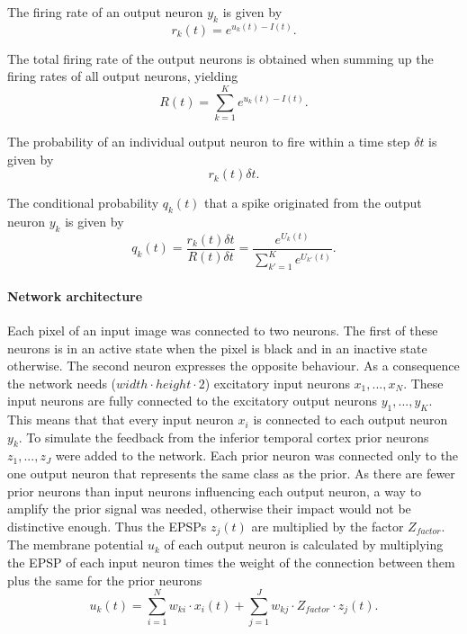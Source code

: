 The firing rate of an output neuron $y_k$ is given by
\begin{equation}
\label{eqn:rk}
r_k(t) = e^{u_k(t) - I(t)}.
\end{equation}

The total firing rate of the output neurons is obtained when summing up the firing rates of all output neurons, yielding 
\begin{equation}
\label{eqn:R}
R(t) = \sum_{k=1}^K e^{u_k(t) - I(t)}.
\end{equation}

The probability of an individual output neuron to fire within a time step $\delta t$ is given by
\begin{equation}
\label{eqn:rkdt}
r_k(t) \delta t.
\end{equation}

The conditional probability $q_k(t)$ that a spike originated from the output neuron $y_k$ is given by
\begin{equation}
\label{eqn:qk}
q_k(t) = \frac{r_k(t) \delta t}{R(t) \delta t} = \frac{e^{U_k(t)}}{\sum_{k'=1}^K e^{U_{k'}(t)}}.
\end{equation}

\paragraph{Network architecture}
Each pixel of an input image was connected to two neurons. The first of these neurons is in an active state when the pixel is black and in an inactive state otherwise. The second neuron expresses the opposite behaviour. As a consequence the network needs ($width \cdot height \cdot 2$) excitatory input neurons $x_1,...,x_N$. These input neurons are fully connected to the excitatory output neurons $y_1,...,y_K$. This means that that every input neuron $x_i$ is connected to each output neuron $y_k$. 
To simulate the feedback from the inferior temporal cortex prior neurons $z_1,...,z_J$ were added to the network. Each prior neuron was connected only to the one  output neuron that represents the same class as the prior. As there are fewer prior neurons than input neurons influencing each output neuron, a way to amplify the prior signal was needed, otherwise their impact would not be distinctive enough. Thus the EPSPs $z_j(t)$ are multiplied by the factor $Z_{factor}$.
The membrane potential $u_k$ of each output neuron is calculated by multiplying the EPSP of each input neuron times the weight of the connection between them plus the same for the prior neurons
\begin{equation}
\label{eqn:uk}
u_k(t) = \sum_{i=1}^N w_{ki} \cdot x_i(t) + \sum_{j=1}^J w_{kj} \cdot Z_{factor} \cdot z_j(t).
\end{equation}

